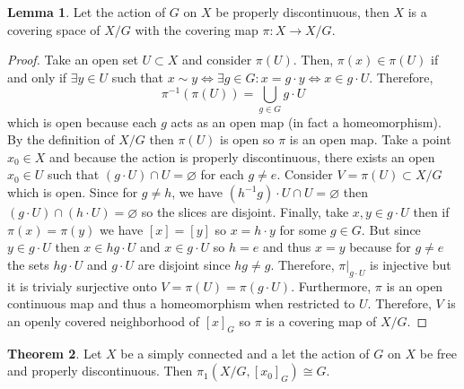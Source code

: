 \documentclass[12pt]{article}
\renewcommand{\empty}{\varnothing}
\theoremstyle{remark}
\theoremstyle{definition}
\newtheorem{theorem}{Theorem}[section]
\newtheorem{lemma}[theorem]{Lemma}
\begin{document}
\begin{lemma}
Let the action of $G$ on $X$ be properly discontinuous, then $X$ is a covering space of $X/G$ with the covering map $\pi : X \to X/G$.
\end{lemma}

\begin{proof}
Take an open set $U \subset X$ and consider $\pi(U)$. Then, $\pi(x) \in \pi(U)$ if and only if $\exists y \in U$ such that $x \sim y \iff \exists g \in G : x = g \cdot y \iff x \in g \cdot U$. Therefore,
\[\pi^{-1}(\pi(U))  = \bigcup_{g \in G} g \cdot U\] which is open because each $g$ acts as an open map (in fact a homeomorphism). By the definition of $X/G$ then $\pi(U)$ is open so $\pi$ is an open map. Take a point $x_0 \in X$ and because the action is properly discontinuous, there exists an open $x_0 \in U$ such that $(g \cdot U) \cap U = \empty$ for each $g \neq e$. Consider $V = \pi(U) \subset X/G$ which is open. Since for $g \neq h$, we have $(h^{-1} g) \cdot U \cap U = \empty$ then $(g \cdot U) \cap (h \cdot U) = \empty$ so the slices are disjoint. Finally, take $x, y \in g \cdot U$ then if $\pi(x) = \pi(y)$ we have $[x] = [y]$ so $x = h \cdot y$ for some $g \in G$. But since $y \in g \cdot U$ then $x \in hg \cdot U$ and $x \in g \cdot U$ so $h = e$ and thus $x = y$ because for $g \neq e$ the sets $hg \cdot U$ and $g \cdot U$ are disjoint since $hg \neq g$. Therefore, $\pi|_{g \cdot U}$ is injective but it is trivialy surjective onto $V = \pi(U) = \pi(g \cdot U)$. Furthermore, $\pi$ is an open continuous map and thus a homeomorphism when restricted to $U$. Therefore, $V$ is an openly covered neighborhood of $[x]_G$ so $\pi$ is a covering map of $X/G$.  
\end{proof}

\newpage

\begin{theorem}
Let $X$ be a simply connected and a let the action of $G$ on $X$ be free and properly discontinuous. Then $\pi_1(X/G, [x_0]_G) \cong G$.
\end{theorem} 
\end{document}
